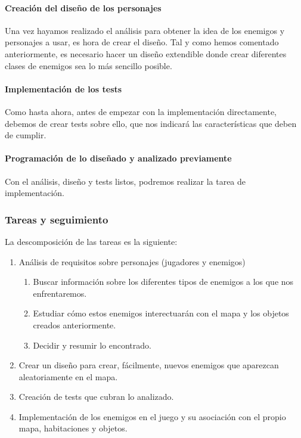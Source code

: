 \paragraph{Creación del diseño de los personajes} Una vez hayamos realizado el análisis para obtener la idea de los enemigos y personajes a usar, es hora de crear el diseño. Tal y como hemos comentado anteriormente, es necesario hacer un diseño extendible donde crear diferentes clases de enemigos sea lo más sencillo posible.

\paragraph{Implementación de los tests} Como hasta ahora, antes de empezar con la implementación directamente, debemos de crear tests sobre ello, que nos indicará las características que deben de cumplir.

\paragraph{Programación de lo diseñado y analizado previamente} Con el análisis, diseño y tests listos, podremos realizar la tarea de implementación.

\subsubsection{Tareas y seguimiento}

La descomposición de las tareas es la siguiente:

\begin{enumerate}[label=\bfseries WBS 2.\arabic*]
  \item Análisis de requisitos sobre personajes (jugadores y enemigos)
    \begin{enumerate}[label=\bfseries WBS 2.1.\arabic*]
      \item Buscar información sobre los diferentes tipos de enemigos a los que nos enfrentaremos.
      \item Estudiar cómo estos enemigos interectuarán con el mapa y los objetos creados anteriormente.
      \item Decidir y resumir lo encontrado.
    \end{enumerate}
  \item Crear un diseño para crear, fácilmente, nuevos enemigos que aparezcan aleatoriamente en el mapa.
  \item Creación de tests que cubran lo analizado.
  \item Implementación de los enemigos en el juego y su asociación con el propio mapa, habitaciones y objetos.
\end{enumerate}

